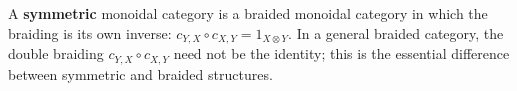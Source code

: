 A \textbf{symmetric} monoidal category is a braided monoidal category in which the braiding is its own inverse: $c_{Y,X} \circ c_{X,Y} = 1_{X \otimes Y}$. In a general braided category, the double braiding $c_{Y,X} \circ c_{X,Y}$ need not be the identity; this is the essential difference between symmetric and braided structures.